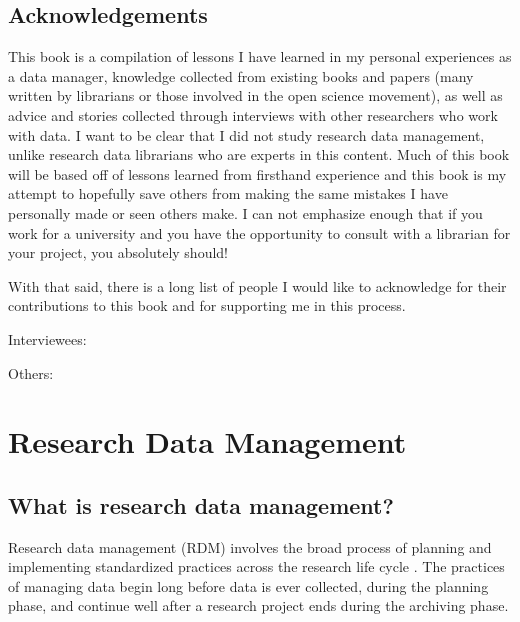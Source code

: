 \documentclass[
]{book}
\begin{document}
\hypertarget{acknowledgements}{%
\section{Acknowledgements}\label{acknowledgements}}

This book is a compilation of lessons I have learned in my personal experiences as a data manager, knowledge collected from existing books and papers (many written by librarians or those involved in the open science movement), as well as advice and stories collected through interviews with other researchers who work with data. I want to be clear that I did not study research data management, unlike research data librarians who are experts in this content. Much of this book will be based off of lessons learned from firsthand experience and this book is my attempt to hopefully save others from making the same mistakes I have personally made or seen others make. I can not emphasize enough that if you work for a university and you have the opportunity to consult with a librarian for your project, you absolutely should!

With that said, there is a long list of people I would like to acknowledge for their contributions to this book and for supporting me in this process.

Interviewees:

Others:

\hypertarget{research-data-management}{%
\chapter{Research Data Management}\label{research-data-management}}

\hypertarget{what-is-research-data-management}{%
\section{What is research data management?}\label{what-is-research-data-management}}

Research data management (RDM) involves the broad process of planning and implementing standardized practices across the research life cycle \autocite{borghi_promoting_2022}. The practices of managing data begin long before data is ever collected, during the planning phase, and continue well after a research project ends during the archiving phase.
\end{document}
